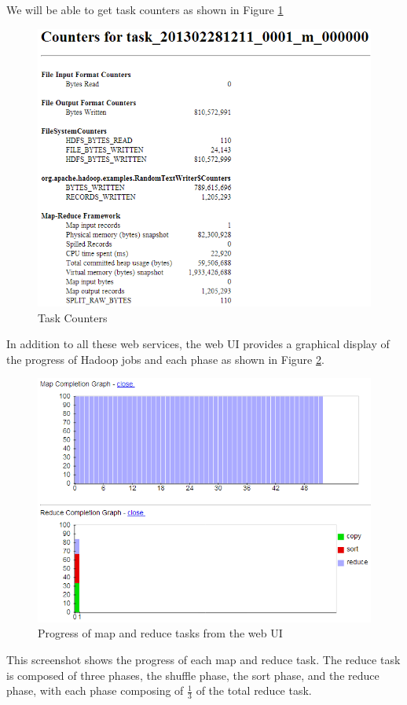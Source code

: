 We will be able to get task counters as shown in Figure \ref{fig:task.counters}
\begin{figure}[ht]
  \centering
  \includegraphics[width=.8\textwidth]{figs/5163os_04_05.png}
  \caption{Task Counters}\label{fig:task.counters}
\end{figure} 
In addition to all these web services, the web UI provides a graphical display of the progress of Hadoop jobs and each phase as shown in Figure \ref{fig:mapreduce.progress}.
\begin{figure}[ht]
  \centering
  \includegraphics[width=.8\textwidth]{figs/5163os_04_06.png}
  \caption{Progress of map and reduce tasks from the web UI}\label{fig:mapreduce.progress}
\end{figure} 
This screenshot shows the progress of each map and reduce task. The reduce task is composed of three phases, the shuffle phase, the sort phase, and the reduce phase, with each phase composing of $\frac{1}{3}$ of the total reduce task.

